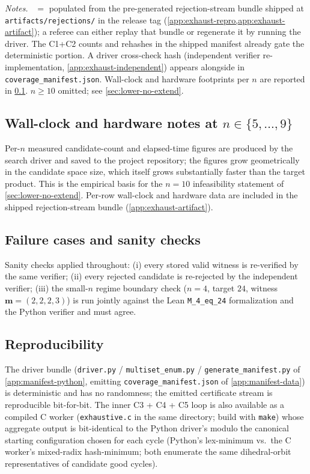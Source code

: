 \documentclass[11pt,a4paper]{article}
\theoremstyle{plain}
\theoremstyle{definition}
\begin{document}
\begin{table}[ht]
\medskip
\textit{Notes.} \dag\ $=$ populated from the pre-generated
rejection-stream bundle shipped at
\texttt{artifacts/rejections/} in the release tag
(\cref{app:exhaust-repro,app:exhaust-artifact}); a referee can
either replay that bundle or regenerate it by running the driver.
The C1+C2 counts and rehashes in the shipped manifest already
gate the deterministic portion.  A driver cross-check hash (independent
verifier re-implementation, \cref{app:exhaust-independent}) appears
alongside in \texttt{coverage\_manifest.json}.  Wall-clock and
hardware footprints per $n$ are reported in
\cref{app:exhaust-budget}.  $n \ge 10$ omitted; see \cref{sec:lower-no-extend}.
\end{table}

\subsection{Wall-clock and hardware notes at $n \in \{5, \ldots, 9\}$}\label{app:exhaust-budget}

Per-$n$ measured candidate-count and elapsed-time figures are produced
by the search driver and saved to the project repository; the figures
grow geometrically in the candidate space size, which itself grows
substantially faster than the target product.  This is the empirical
basis for the $n = 10$ infeasibility statement of
\cref{sec:lower-no-extend}.  Per-row wall-clock and hardware data
are included in the shipped rejection-stream bundle
(\cref{app:exhaust-artifact}).

\subsection{Failure cases and sanity checks}\label{app:exhaust-sanity}

Sanity checks applied throughout: (i) every stored valid witness is
re-verified by the same verifier; (ii) every rejected candidate is
re-rejected by the independent verifier; (iii) the small-$n$ regime
boundary check ($n = 4$, target $24$, witness
$\mathbf{m} = (2, 2, 2, 3)$) is run jointly against the Lean
\texttt{M\_4\_eq\_24} formalization and the Python verifier and must
agree.

\subsection{Reproducibility}\label{app:exhaust-repro}

The driver bundle
(\texttt{driver.py} / \texttt{multiset\_enum.py} /
\texttt{generate\_manifest.py} of \cref{app:manifest-python},
emitting \texttt{coverage\_manifest.json} of
\cref{app:manifest-data}) is deterministic and has no randomness;
the emitted certificate stream is reproducible bit-for-bit.  The
inner C3 + C4 + C5 loop is also available as a compiled C worker
(\texttt{exhaustive.c} in the same directory; build with
\texttt{make}) whose aggregate output is bit-identical to the
Python driver's modulo the canonical starting configuration
chosen for each cycle (Python's lex-minimum vs.\ the C worker's
mixed-radix hash-minimum; both enumerate the same dihedral-orbit
representatives of candidate good cycles).
\end{document}
